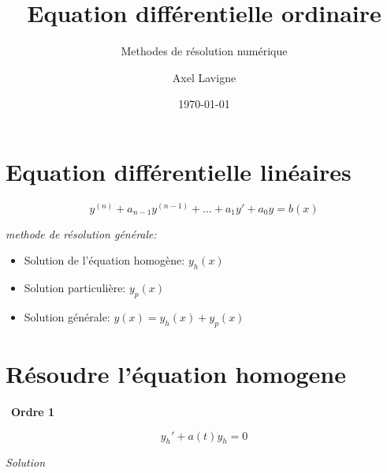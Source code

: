 \documentclass{article}
\title{Equation différentielle ordinaire}
\subtitle{Methodes de résolution numérique}
\author{Axel Lavigne}
\date{\today}
\begin{document}
\maketitle

\section*{Equation différentielle linéaires}

\begin{equation*}
    y^{(n)} + a_{n-1}y^{(n-1)} + \ldots + a_1y' + a_0y = b(x)
\end{equation*}

\textit{methode de résolution générale:}
\begin{itemize}
    \item[--] Solution de l'équation homogène: $y_h(x)$
    \item[--] Solution particulière: $y_p(x)$
    \item[--] Solution générale: $y(x) = y_h(x) + y_p(x)$
\end{itemize}

\section*{Résoudre l'équation homogene}

\hrulefill \,
\textbf{Ordre 1}
\hrulefill 

\begin{equation*}
    y_h' + a(t)y_h = 0
\end{equation*}


\begin{center}
    \textit{Solution } \\ \vspace{1mm}
\end{center}
\end{document}
